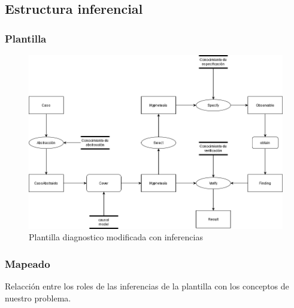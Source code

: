 \subsection{Estructura inferencial}

\subsubsection{Plantilla}
\begin{figure}[H]
  \centering
  \includegraphics[scale=0.45]{imagenes/PlantillaDiagnosticoModificadaInferencia.png}
  \caption{\label{fig:PlantillaDiagnosticoModificadaInferencia}Plantilla diagnostico modificada con inferencias}
\end{figure}

\newpage

\subsubsection{Mapeado}
Relacción entre los roles de las inferencias de la plantilla con los conceptos de nuestro problema.

